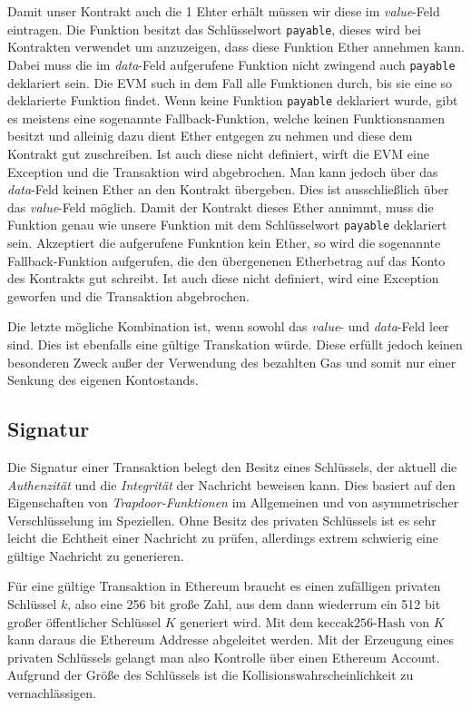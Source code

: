 \documentclass[runningheads]{llncs}
\begin{document}
Damit unser Kontrakt auch die 1 Ehter erhält müssen wir diese im \textit{value}-Feld eintragen. Die Funktion besitzt das Schlüsselwort \texttt{payable}, dieses wird bei Kontrakten verwendet um anzuzeigen, dass diese Funktion Ether annehmen kann. Dabei muss die im \textit{data}-Feld aufgerufene Funktion nicht zwingend auch \texttt{payable} deklariert sein. Die EVM such in dem Fall alle Funktionen durch, bis sie eine so deklarierte Funktion findet. Wenn keine Funktion \texttt{payable} deklariert wurde, gibt es meistens eine sogenannte Fallback-Funktion, welche keinen Funktionsnamen besitzt und alleinig dazu dient Ether entgegen zu nehmen und diese dem Kontrakt gut zuschreiben. Ist auch diese nicht definiert, wirft die EVM eine Exception und die Transaktion wird abgebrochen.
Man kann jedoch über das \textit{data}-Feld keinen Ether an den Kontrakt übergeben. Dies ist ausschließlich über das \textit{value}-Feld möglich. Damit der Kontrakt dieses Ether annimmt, muss die Funktion genau wie unsere Funktion mit dem Schlüsselwort \texttt{payable} deklariert sein. Akzeptiert die aufgerufene Funkntion kein Ether, so wird die sogenannte Fallback-Funktion aufgerufen, die den übergenenen Etherbetrag auf das Konto des Kontrakts gut schreibt. Ist auch diese nicht definiert, wird eine Exception geworfen und die Transaktion abgebrochen.%

Die letzte mögliche Kombination ist, wenn sowohl das \textit{value}- und \textit{data}-Feld leer sind. Dies ist ebenfalls eine gültige Transkation würde. Diese erfüllt jedoch keinen besonderen Zweck außer der Verwendung des bezahlten Gas und somit nur einer Senkung des eigenen Kontostands.

\subsection{Signatur}
Die Signatur einer Transaktion belegt den Besitz eines Schlüssels, der aktuell die \textit{Authenzität} und die \textit{Integrität} der Nachricht beweisen kann. Dies basiert auf den Eigenschaften von \textit{Trapdoor-Funktionen} im Allgemeinen und von asymmetrischer Verschlüsselung im Speziellen. Ohne Besitz des privaten Schlüssels ist es sehr leicht die Echtheit einer Nachricht zu prüfen, allerdings extrem schwierig eine gültige Nachricht zu generieren. \cite{roeder_asymmetric-key_nodate}

Für eine gültige Transaktion in Ethereum braucht es einen zufälligen privaten Schlüssel $ k $, also eine 256 bit große Zahl, aus dem dann wiederrum ein 512 bit großer öffentlicher Schlüssel $ K $ generiert wird. Mit dem $ \text{keccak256-Hash} $ von $ K $ kann daraus die Ethereum Addresse abgeleitet werden. Mit der Erzeugung eines privaten Schlüssels gelangt man also Kontrolle über einen Ethereum Account. Aufgrund der Größe des Schlüssels ist die Kollisionswahrscheinlichkeit zu vernachlässigen.
\end{document}
